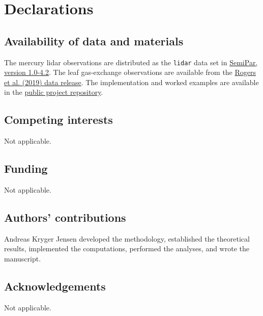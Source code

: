 \section*{Declarations}

\subsection*{Availability of data and materials}
The mercury lidar observations are distributed as the \texttt{lidar}
data set in \href{https://cran.r-project.org/src/contrib/Archive/SemiPar/SemiPar_1.0-4.2.tar.gz}{SemiPar, version 1.0-4.2}.
The leaf gas-exchange observations are available from the
\href{https://doi.org/10.5440/1482338}{Rogers et al. (2019) data release}.
The implementation and worked examples are available in the
\href{https://github.com/aejensen/constrained-HSGP}{public project repository}.

\subsection*{Competing interests}
Not applicable.

\subsection*{Funding}
Not applicable.

\subsection*{Authors' contributions}
Andreas Kryger Jensen developed the methodology, established the
theoretical results, implemented the computations, performed the
analyses, and wrote the manuscript.

\subsection*{Acknowledgements}
Not applicable.
